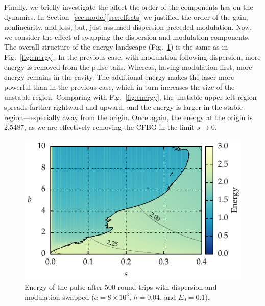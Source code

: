 \documentclass[9pt,twocolumn,twoside]{osajnl}
\begin{document}
Finally, we briefly investigate the affect the order of the components has on the dynamics. In Section~\ref{sec:model}\ref{sec:effects} we justified the order of the gain, nonlinearity, and loss, but, just assumed dispersion preceded modulation. Now, we consider the effect of swapping the dispersion and modulation components. The overall structure of the energy landscape (Fig.~\ref{fig:energyswitch}) is the same as in Fig.~\ref{fig:energy}. In the previous case, with modulation following dispersion, more energy is removed from the pulse tails. Whereas, having modulation first, more energy remains in the cavity. The additional energy makes the laser more powerful than in the previous case, which in turn increases the size of the unstable region. Comparing with Fig.~\ref{fig:energy}, the unstable upper-left region spreads farther rightward and upward, and the energy is larger in the stable region---especially away from the origin. Once again, the energy at the origin is 2.5487, as we are effectively removing the CFBG in the limit $s \rightarrow 0$.

\begin{figure}[tbp]
	\centering
	\includegraphics{Figures/ParamSpaceEnergySwitch}
	\caption{Energy of the pulse after 500 round trips with dispersion and modulation swapped ($a = 8 \times 10^3$, $h = 0.04$, and $E_0 = 0.1$).}
	\label{fig:energyswitch}
\end{figure}
\end{document}
